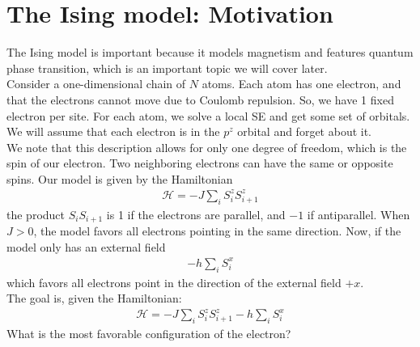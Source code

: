 \documentclass{book}
\theoremstyle{definition}
\newcommand{\had}{\mathcal{H}}
\begin{document}
\newpage
   





\section{The Ising model: Motivation}

The Ising model is important because it models magnetism and features quantum phase transition, which is an important topic we will cover later.\\

Consider a one-dimensional chain of $N$ atoms. Each atom has one electron, and that the electrons cannot move due to Coulomb repulsion. So, we have 1 fixed electron per site. For each atom, we solve a local SE and get some set of orbitals. \\

We will assume that each electron is in the $p^z$ orbital and forget about it. \\

We note that this description allows for only one degree of freedom, which is the spin of our electron. Two neighboring electrons can have the same or opposite spins. Our model is given by the Hamiltonian
\begin{align}
\had = -J \sum_i S_i^z S_{i+1}^z
\end{align}
the product $S_iS_{i+1}$ is 1 if the electrons are parallel, and $-1$ if antiparallel. When $J > 0$, the model favors all electrons pointing in the same direction. Now, if the model only has an external field
\begin{align}
-h \sum_i S_i^x
\end{align}
which favors all electrons point in the direction of the external field $+x$. \\

The goal is, given the Hamiltonian:
\begin{align}
\had = -J \sum_i S^z_i S^z_{i+1} - h \sum_i S^x_i
\end{align}
What is the most favorable configuration of the electron?
\end{document}
